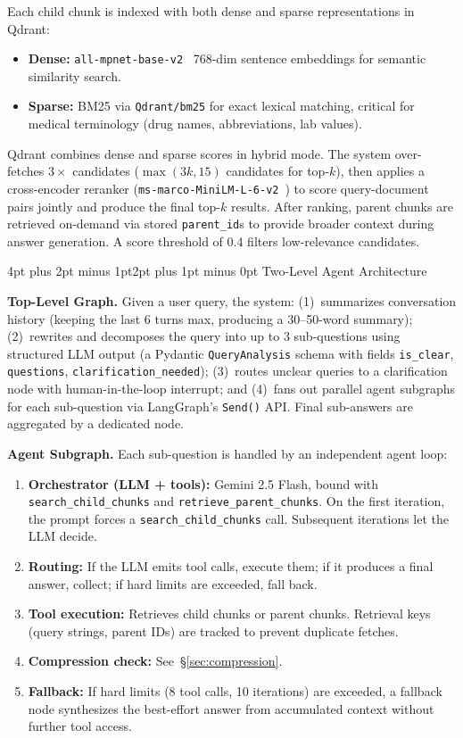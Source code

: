 \documentclass[10pt,twocolumn,letterpaper]{article}
\makeatletter
\renewcommand\subsection{\@startsection{subsection}{2}{\z@}%
  {4pt plus 2pt minus 1pt}{2pt plus 1pt minus 0pt}%
  {\normalsize\bfseries}}
\makeatother
\begin{document}
Each child chunk is indexed with both dense and sparse representations in Qdrant:
\begin{itemize}[nosep,leftmargin=*]
  \item \textbf{Dense:} \texttt{all-mpnet-base-v2}~\cite{reimers2019sentence} 768-dim sentence embeddings for semantic similarity search.
  \item \textbf{Sparse:} BM25 via \texttt{Qdrant/bm25} for exact lexical matching, critical for medical terminology (drug names, abbreviations, lab values).
\end{itemize}
Qdrant combines dense and sparse scores in hybrid mode. The system over-fetches $3\times$ candidates ($\max(3k, 15)$ candidates for top-$k$), then applies a cross-encoder reranker (\texttt{ms-marco-MiniLM-L-6-v2}~\cite{nogueira2019passage}) to score query-document pairs jointly and produce the final top-$k$ results. After ranking, parent chunks are retrieved on-demand via stored \texttt{parent\_id}s to provide broader context during answer generation. A score threshold of 0.4 filters low-relevance candidates.

\subsection{Two-Level Agent Architecture}

\textbf{Top-Level Graph.} Given a user query, the system: (1)~summarizes conversation history (keeping the last 6 turns max, producing a 30--50-word summary); (2)~rewrites and decomposes the query into up to 3 sub-questions using structured LLM output (a Pydantic \texttt{QueryAnalysis} schema with fields \texttt{is\_clear}, \texttt{questions}, \texttt{clarification\_needed}); (3)~routes unclear queries to a clarification node with human-in-the-loop interrupt; and (4)~fans out parallel agent subgraphs for each sub-question via LangGraph's \texttt{Send()} API. Final sub-answers are aggregated by a dedicated node.

\textbf{Agent Subgraph.} Each sub-question is handled by an independent agent loop:
\begin{enumerate}[nosep,leftmargin=*,label=\arabic*.]
\item \textbf{Orchestrator (LLM + tools):} Gemini 2.5 Flash, bound with \texttt{search\_child\_chunks} and \texttt{retrieve\_parent\_chunks}. On the first iteration, the prompt forces a \texttt{search\_child\_chunks} call. Subsequent iterations let the LLM decide.
\item \textbf{Routing:} If the LLM emits tool calls, execute them; if it produces a final answer, collect; if hard limits are exceeded, fall back.
\item \textbf{Tool execution:} Retrieves child chunks or parent chunks. Retrieval keys (query strings, parent IDs) are tracked to prevent duplicate fetches.
\item \textbf{Compression check:} See~\S\ref{sec:compression}.
\item \textbf{Fallback:} If hard limits (8 tool calls, 10 iterations) are exceeded, a fallback node synthesizes the best-effort answer from accumulated context without further tool access.
\end{enumerate}
\end{document}
